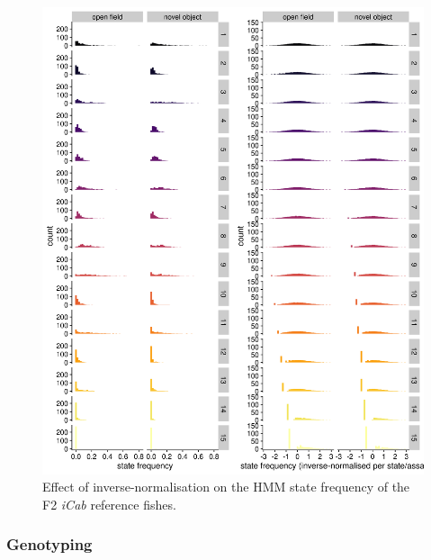 \documentclass[
]{article}
\begin{document}
\begin{figure}
\includegraphics[width=1\linewidth]{figs/mikk_behaviour/0.08_15_state_freq_F2_sge} \caption{Effect of inverse-normalisation on the HMM state frequency of the F2 \emph{\textcolor{iCab_424B4D}{iCab}} reference fishes.}\label{fig:F2-state-freq-sge}
\end{figure}

\hypertarget{genotyping}{%
\subsubsection{Genotyping}\label{genotyping}}
\end{document}
